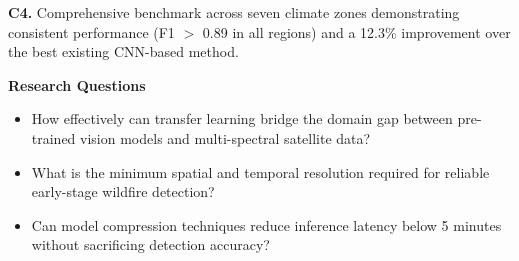 \documentclass[10pt]{article}
\newlength{\panelwidth}
\newcommand{\subheading}[1]{%
  \medskip
  {\color{secondary}\bfseries\small #1}
  \smallskip
}
\newcommand{\smallsep}{\vspace{6pt}}
\begin{document}
\begin{minipage}[t]{\panelwidth}
  \begin{accentstrip}
    {\footnotesize\bfseries\color{accent!80!black}C4.}
    {\footnotesize\color{darktext} Comprehensive benchmark
    across seven climate zones demonstrating consistent
    performance (F1 $>$ 0.89 in all regions) and a 12.3\%
    improvement over the best existing CNN-based method.}
  \end{accentstrip}

  \smallsep

  \subheading{Research Questions}

  {\footnotesize\color{darktext}
  \begin{itemize}
    \item[\color{primary}\textbf{RQ1.}] How effectively can
      transfer learning bridge the domain gap between
      pre-trained vision models and multi-spectral
      satellite data?
    \item[\color{primary}\textbf{RQ2.}] What is the minimum
      spatial and temporal resolution required for reliable
      early-stage wildfire detection?
    \item[\color{primary}\textbf{RQ3.}] Can model compression
      techniques reduce inference latency below 5 minutes
      without sacrificing detection accuracy?
  \end{itemize}
  }

\end{minipage}

\newpage

\end{document}
